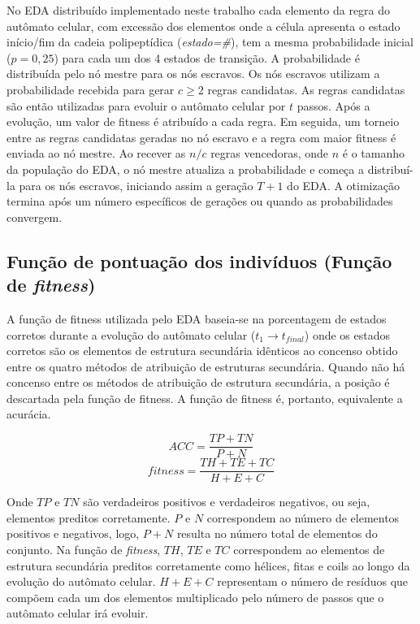 No EDA distribuído implementado neste trabalho cada elemento da regra do autômato celular, com excessão dos elementos onde a célula apresenta o estado início/fim da cadeia polipeptídica (\textit{estado=\#}),  tem a mesma probabilidade inicial ($p=0,25$) para cada um dos 4 estados de transição. A probabilidade é distribuída pelo nó mestre para os nós escravos. Os nós escravos utilizam a probabilidade recebida para gerar $c \ge 2 $ regras candidatas. As regras candidatas são então utilizadas para evoluir o autômato celular por $t$ passos. Após a evolução, um valor de fitness é atribuído a cada regra. Em seguida, um torneio entre as regras candidatas geradas no nó escravo e a regra com maior fitness é enviada ao nó mestre. Ao recever as $n/c$ regras vencedoras, onde $n$ é o tamanho da população do EDA, o nó mestre atualiza a probabilidade e começa a distribuí-la para os nós escravos, iniciando assim a geração $T+1$ do EDA. A otimização termina após um número específicos de gerações ou quando as probabilidades convergem.


\subsection{Função de pontuação dos indivíduos (Função de \textit{fitness})}

A função de fitness utilizada pelo EDA baseia-se na porcentagem de estados corretos durante a evolução do autômato celular ($t_1 \rightarrow t_{final}$) onde os estados corretos são os elementos de estrutura secundária idênticos ao concenso obtido entre os quatro métodos de atribuição de estruturas secundária. Quando não há concenso entre os métodos de atribuição de estrutura secundária, a posição é descartada pela função de fitness. A função de fitness é, portanto, equivalente a acurácia.

\begin{equation} \label{eq:fitness}
ACC = \frac{TP + TN}{P + N}
\end{equation}
\begin{equation}
fitness =  \frac{TH + TE + TC}{H + E + C}
\end{equation}

Onde $TP$ e $TN$ são verdadeiros positivos e verdadeiros negativos, ou seja, elementos preditos corretamente. $P$ e $N$ correspondem ao número de elementos positivos e negativos, logo, $P+N$ resulta no número total de elementos do conjunto. Na função de \textit{fitness}, $TH$, $TE$ e $TC$ correspondem ao elementos de estrutura secundária preditos corretamente como hélices, fitas e coils ao longo da evolução do autômato celular. $H+E+C$ representam o número de resíduos que compõem cada um dos elementos multiplicado pelo número de passos que o autômato celular irá evoluir.




